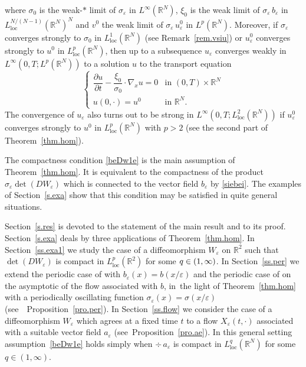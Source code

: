 \documentclass[JEP,XML,SOM,Unicode]{cedram}
\newcommand{\loc}{\mathrm{loc}}
\newcommand{\spfrac}[2]{{#1}/{(#2)}}
\def \RR {\mathbb R}
\theoremstyle{plain}
\theoremstyle{definition}
\begin{document}
where $\sigma_0$ is the weak-$\ast$ limit of $\sigma_\varepsilon$ in $L^\infty(\RR^N)$, $\xi_0$ is the weak limit of $\sigma_\varepsilon\,b_\varepsilon$ in $L^{\spfrac{N}{N-1}}_\loc(\RR^N)^N$ and $v^0$ the weak limit of $\sigma_\varepsilon\,u_\varepsilon^0$ in $L^p(\RR^N)$. Moreover, if $\sigma_\varepsilon$ converges strongly to $\sigma_0$ in $L^1_\loc(\RR^N)$ (see Remark~\ref{rem.vsiu}) or $u_\varepsilon^0$ converges strongly to $u^0$ in $L^p_\loc(\RR^N)$, then up to a subsequence $u_\varepsilon$ converges weakly in $L^\infty(0,T;L^p(\RR^N))$ to a solution $u$ to the transport equation
\begin{equation}\label{equ1}
\begin{cases}
\dfrac{\partial u}{\partial t}-\dfrac{\xi_0}{\sigma_0}\cdot\nabla_x u=0 & \mbox{in }(0,T)\times\RR^N
\\[5pt]
u(0,\cdot)=u^0 & \mbox{in }\RR^N.
\end{cases}
\end{equation}
The convergence of $u_\varepsilon$ also turns out to be strong in $L^\infty(0,T;L^2_\loc(\RR^N))$ if $u_\varepsilon^0$ converges strongly to $u^0$ in $L^p_\loc(\RR^N)$ with $p>2$ (see the second part of Theorem~\ref{thm.hom}).

The compactness condition \eqref{beDw1e} is the main assumption of Theorem~\ref{thm.hom}. It is equivalent to the compactness of the product $\sigma_\varepsilon\det(DW_\varepsilon)$ which is connected to the vector field $b_\varepsilon$ by \eqref{siebei}. The examples of Section~\ref{s.exa} show that this condition may be satisfied in quite general situations.

Section~\ref{s.res} is devoted to the statement of the main result and to its proof.
Section~\ref{s.exa} deals by three applications of Theorem~\ref{thm.hom}.
In Section~\ref{ss.exa1} we study the case of a diffeomorphism $W_\varepsilon$ on $\RR^2$ such that $\det(DW_\varepsilon)$ is compact in $L^p_\loc(\RR^2)$ for some $q\in\nobreak (1,\infty)$. In Section~\ref{ss.per} we extend the periodic case of \cite{Bre,HoXi,Tas} with $b_\varepsilon(x)=b(x/\varepsilon)$ and the periodic case of \cite[\S 4]{Bri} on the asymptotic of the flow associated with $b$, in~the light of Theorem~\ref{thm.hom} with a periodically oscillating function $\sigma_\varepsilon(x)=\sigma(x/\varepsilon)$ (see~ Proposition~\ref{pro.per}). In Section~\ref{ss.flow} we consider the case of a diffeomorphism $W_\varepsilon$ which agrees at a fixed time $t$ to a flow $X_\varepsilon(t,\cdot)$ associated with a suitable vector field $a_\varepsilon$ (see~Proposition~\ref{pro.ae}). In this general setting assumption~\eqref{beDw1e} holds simply when $\div\,a_\varepsilon$ is compact in $L^q_\loc(\RR^N)$ for some $q\in(1,\infty)$.
\end{document}

